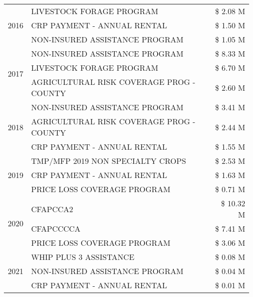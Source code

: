 \begin{tabular}{llr}
\cline{1-3}
\multirow[t]{3}{*}{2016} & LIVESTOCK FORAGE PROGRAM & \$ 2.08 M \\
 & CRP PAYMENT - ANNUAL RENTAL & \$ 1.50 M \\
 & NON-INSURED ASSISTANCE PROGRAM & \$ 1.05 M \\
\cline{1-3}
\multirow[t]{3}{*}{2017} & NON-INSURED ASSISTANCE PROGRAM & \$ 8.33 M \\
 & LIVESTOCK FORAGE PROGRAM & \$ 6.70 M \\
 & AGRICULTURAL RISK COVERAGE PROG - COUNTY & \$ 2.60 M \\
\cline{1-3}
\multirow[t]{3}{*}{2018} & NON-INSURED ASSISTANCE PROGRAM & \$ 3.41 M \\
 & AGRICULTURAL RISK COVERAGE PROG - COUNTY & \$ 2.44 M \\
 & CRP PAYMENT - ANNUAL RENTAL & \$ 1.55 M \\
\cline{1-3}
\multirow[t]{3}{*}{2019} & TMP/MFP 2019 NON SPECIALTY CROPS & \$ 2.53 M \\
 & CRP PAYMENT - ANNUAL RENTAL & \$ 1.63 M \\
 & PRICE LOSS COVERAGE PROGRAM & \$ 0.71 M \\
\cline{1-3}
\multirow[t]{3}{*}{2020} & CFAPCCA2 & \$ 10.32 M \\
 & CFAPCCCCA & \$ 7.41 M \\
 & PRICE LOSS COVERAGE PROGRAM & \$ 3.06 M \\
\cline{1-3}
\multirow[t]{3}{*}{2021} & WHIP PLUS 3 ASSISTANCE & \$ 0.08 M \\
 & NON-INSURED ASSISTANCE PROGRAM & \$ 0.04 M \\
 & CRP PAYMENT - ANNUAL RENTAL & \$ 0.01 M \\
\cline{1-3}
\bottomrule
\end{tabular}
